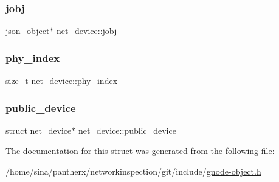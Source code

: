 \subsubsection{\texorpdfstring{jobj}{jobj}}
{\footnotesize\ttfamily json\+\_\+object$\ast$ net\+\_\+device\+::jobj}

\mbox{\label{structnet__device_a793c401280eb3afa81db485466aa77f2}} 
\subsubsection{\texorpdfstring{phy\+\_\+index}{phy\_index}}
{\footnotesize\ttfamily size\+\_\+t net\+\_\+device\+::phy\+\_\+index}

\mbox{\label{structnet__device_aa50aa45beac692be04baf4faf9d063d4}} 
\subsubsection{\texorpdfstring{public\+\_\+device}{public\_device}}
{\footnotesize\ttfamily struct \hyperlink{structnet__device}{net\+\_\+device}$\ast$ net\+\_\+device\+::public\+\_\+device}



The documentation for this struct was generated from the following file\+:\begin{DoxyCompactItemize}
\item 
/home/sina/pantherx/networkinspection/git/include/\hyperlink{gnode-object_8h}{gnode-\/object.\+h}\end{DoxyCompactItemize}
